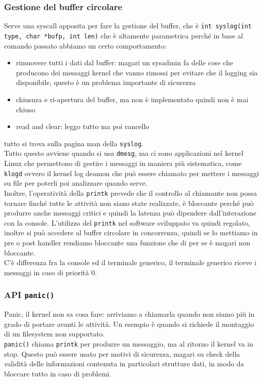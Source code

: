 \documentclass[12pt, oneside]{extbook}
\begin{document}
\subsubsection{Gestione del buffer circolare}
Serve una syscall apposita per fare la gestione del buffer, che è \texttt{int syslog(int type, char *bufp, int len)} che è altamente parametrica perché in base al comando passato abbiamo un certo comportamento:
\begin{itemize}
\item rimuovere tutti i dati dal buffer: magari un sysadmin fa delle cose che producono dei messaggi kernel che vanno rimossi per evitare che il logging sia disponibile, questo è un problema importante di sicurezza
\item chiusura e ri-apertura del buffer, ma non è implementato quindi non è mai chiuso
\item read and clear: leggo tutto ma poi cancello
\end{itemize}
tutto si trova sulla pagina man della \texttt{syslog}.\\Tutto questo avviene quando si usa \texttt{dmesg}, ma ci sono applicazioni nel kernel Linux che permettono di gestire i messaggi in maniera più sistematica, come \texttt{klogd} ovvero il kernel log deamon che può essere chiamato per mettere i messaggi su file per poterli poi analizzare quando serve.\\Inoltre, l'operatività della \texttt{printk} prevede che il controllo al chiamante non possa tornare finché tutte le attività non siano state realizzate, è bloccante perché può produrre anche messaggi critici e quindi la latenza può dipendere dall'interazione con la console. L'utilizzo del \texttt{printk} nel software sviluppato va quindi regolato, inoltre si può accedere al buffer circolare in concorrenza, quindi se lo mettiamo in pre o post handler rendiamo bloccante una funzione che di per se è magari non bloccante.\\C'è differenza fra la console ed il terminale generico, il terminale generico riceve i messaggi in caso di priorità 0.
\subsubsection{API \texttt{panic()}}
Panic, il kernel non sa cosa fare: arriviamo a chiamarla quando non siamo più in grado di portare avanti le attività. Un esempio è quando si richiede il montaggio di un filesystem non supportato.\\ \texttt{panic()} chiama \texttt{printk} per produrre un messaggio, ma al ritorno il kernel va in stop. Questo può essere usato per motivi di sicurezza, magari su check della validità delle informazioni contenuta in particolari strutture dati, in modo da bloccare tutto in caso di problemi.
\end{document}
